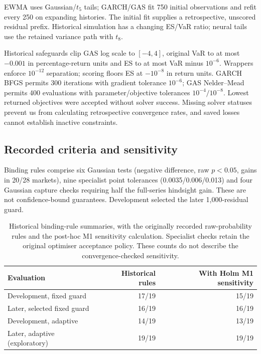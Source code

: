EWMA uses Gaussian/$t_5$ tails; GARCH/GAS fit 750 initial observations and refit every 250 on expanding histories. The initial fit supplies a retrospective, unscored residual prefix. Historical simulation has a changing ES/VaR ratio; neural tails use the retained variance path with $t_8$.

Historical safeguards clip GAS log scale to $[-4,4]$, original VaR to at most $-0.001$ in percentage-return units and ES to at most VaR minus $10^{-6}$. Wrappers enforce $10^{-12}$ separation; scoring floors ES at $-10^{-8}$ in return units. GARCH BFGS permits 300 iterations with gradient tolerance $10^{-6}$; GAS Nelder--Mead permits 400 evaluations with parameter/objective tolerances $10^{-4}/10^{-8}$. Lowest returned objectives were accepted without solver success. Missing solver statuses prevent us from calculating retrospective convergence rates, and saved losses cannot establish inactive constraints.

\subsection{Recorded criteria and sensitivity}

Binding rules comprise six Gaussian tests (negative difference, raw $p<0.05$, gains in 20/28 markets), nine specialist point tolerances (0.0035/0.006/0.013) and four Gaussian capture checks requiring half the full-series hindsight gain. These are not confidence-bound guarantees. Development selected the later 1,000-residual guard.

\begin{table}[htbp]
\centering
\caption[Historical and adjusted decision summaries]{Historical binding-rule summaries, with the originally recorded raw-probability rules and the post-hoc M1 sensitivity calculation. Specialist checks retain the original optimiser acceptance policy. These counts do not describe the convergence-checked sensitivity.}
\label{tab:tail-decision-audit}
\begin{tabular}{lrr}
\toprule
Evaluation & Historical rules & With Holm M1 sensitivity\\
\midrule
Development, fixed guard & 17/19 & 15/19\\
Later, selected fixed guard & 16/19 & 16/19\\
Development, adaptive & 14/19 & 13/19\\
Later, adaptive (exploratory) & 19/19 & 19/19\\
\bottomrule
\end{tabular}
\end{table}

